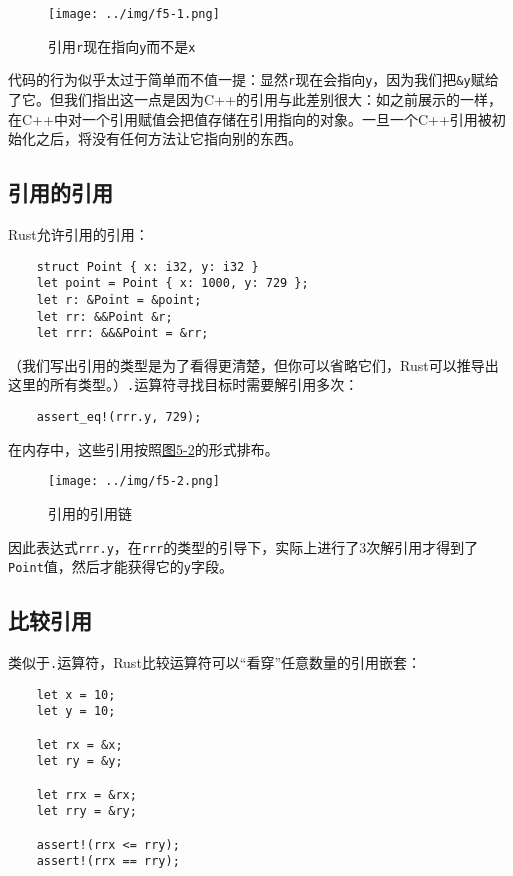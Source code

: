 \begin{figure}[htbp]
    \centering
    \texttt{[image: ../img/f5-1.png]}
    \caption{引用\texttt{r}现在指向\texttt{y}而不是\texttt{x}}
    \label{f5-1}
\end{figure}

代码的行为似乎太过于简单而不值一提：显然\texttt{r}现在会指向\texttt{y}，因为我们把\texttt{\&y}赋给了它。但我们指出这一点是因为C++的引用与此差别很大：如之前展示的一样，在C++中对一个引用赋值会把值存储在引用指向的对象。一旦一个C++引用被初始化之后，将没有任何方法让它指向别的东西。

\subsection{引用的引用}
Rust允许引用的引用：
\begin{verbatim}
    struct Point { x: i32, y: i32 }
    let point = Point { x: 1000, y: 729 };
    let r: &Point = &point;
    let rr: &&Point &r;
    let rrr: &&&Point = &rr;
\end{verbatim}

（我们写出引用的类型是为了看得更清楚，但你可以省略它们，Rust可以推导出这里的所有类型。）\texttt{.}运算符寻找目标时需要解引用多次：
\begin{verbatim}
    assert_eq!(rrr.y, 729);
\end{verbatim}

在内存中，这些引用按照\hyperref[f5-2]{图5-2}的形式排布。

\begin{figure}[htbp]
    \centering
    \texttt{[image: ../img/f5-2.png]}
    \caption{引用的引用链}
    \label{f5-2}
\end{figure}

因此表达式\texttt{rrr.y}，在\texttt{rrr}的类型的引导下，实际上进行了3次解引用才得到了\texttt{Point}值，然后才能获得它的\texttt{y}字段。

\subsection{比较引用}

类似于\texttt{.}运算符，Rust比较运算符可以“看穿”任意数量的引用嵌套：
\begin{verbatim}
    let x = 10;
    let y = 10;

    let rx = &x;
    let ry = &y;

    let rrx = &rx;
    let rry = &ry;

    assert!(rrx <= rry);
    assert!(rrx == rry);
\end{verbatim}


